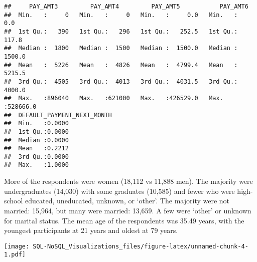 \documentclass[]{article}
\newenvironment{Shaded}{\begin{snugshade}}{\end{snugshade}}
\newcommand{\KeywordTok}[1]{\textcolor[rgb]{0.13,0.29,0.53}{\textbf{#1}}}
\newcommand{\DataTypeTok}[1]{\textcolor[rgb]{0.13,0.29,0.53}{#1}}
\newcommand{\DecValTok}[1]{\textcolor[rgb]{0.00,0.00,0.81}{#1}}
\newcommand{\StringTok}[1]{\textcolor[rgb]{0.31,0.60,0.02}{#1}}
\newcommand{\CommentTok}[1]{\textcolor[rgb]{0.56,0.35,0.01}{\textit{#1}}}
\newcommand{\OperatorTok}[1]{\textcolor[rgb]{0.81,0.36,0.00}{\textbf{#1}}}
\newcommand{\NormalTok}[1]{#1}
\begin{document}
\begin{verbatim}
##     PAY_AMT3         PAY_AMT4         PAY_AMT5           PAY_AMT6       
##  Min.   :     0   Min.   :     0   Min.   :     0.0   Min.   :     0.0  
##  1st Qu.:   390   1st Qu.:   296   1st Qu.:   252.5   1st Qu.:   117.8  
##  Median :  1800   Median :  1500   Median :  1500.0   Median :  1500.0  
##  Mean   :  5226   Mean   :  4826   Mean   :  4799.4   Mean   :  5215.5  
##  3rd Qu.:  4505   3rd Qu.:  4013   3rd Qu.:  4031.5   3rd Qu.:  4000.0  
##  Max.   :896040   Max.   :621000   Max.   :426529.0   Max.   :528666.0  
##  DEFAULT_PAYMENT_NEXT_MONTH
##  Min.   :0.0000            
##  1st Qu.:0.0000            
##  Median :0.0000            
##  Mean   :0.2212            
##  3rd Qu.:0.0000            
##  Max.   :1.0000
\end{verbatim}

More of the respondents were women (18,112 vs 11,888 men). The majority
were undergraduates (14,030) with some graduates (10,585) and fewer who
were high-school educated, uneducated, unknown, or `other'. The majority
were not married: 15,964, but many were married: 13,659. A few were
`other' or unknown for marital status. The mean age of the respondents
was 35.49 years, with the youngest participants at 21 years and oldest
at 79 years.

\begin{Shaded}
\end{Shaded}

\texttt{[image: SQL-NoSQL\_Visualizations\_files/figure-latex/unnamed-chunk-4-1.pdf]}

\begin{Shaded}
\end{Shaded}
\end{document}
